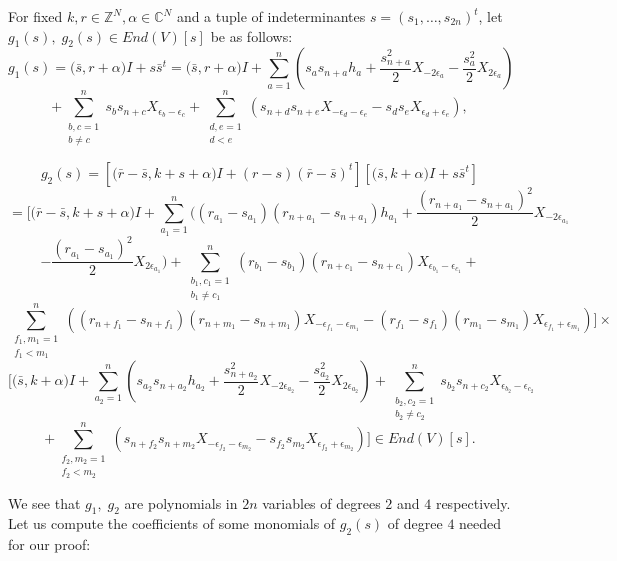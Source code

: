 \documentclass[a4paper,11pt]{amsart}
\numberwithin{equation}{section}
\theoremstyle{plain}
\newcommand{\Z}{\mathbb{Z}}
\newcommand{\C}{\mathbb{C}}
\begin{document}
 For fixed $k,r\in \Z^N, \alpha\in \C^N$ and a tuple of indeterminantes $s=(s_1, \ldots, s_{2n})^t$, let $g_1(s),\; g_2(s)\in End(V)[s]$ be as follows:
 \[g_1(s)= \bm{(}\bar{s},r+\alpha\bm{)}I+s\bar{s}^t=\bm{(}\bar{s},r+\alpha\bm{)}I+\sum_{a=1}^n(s_as_{n+a}h_a+\frac{s_{n+a}^2}{2}X_{-2\epsilon_a}-\frac{s_{a}^2}{2}X_{2\epsilon_a})\]
 \[+\sum_{\substack{b,c=1\\b\neq c}}^ns_bs_{n+c}X_{\epsilon_b-\epsilon_c}+\sum_{\substack{d,e=1\\ d<e}}^n(s_{n+d}s_{n+e}X_{-\epsilon_d-\epsilon_e}-s_ds_eX_{\epsilon_d+\epsilon_e}),\]
 
\[g_2(s)=[\bm{(}\bar{r}-\bar{s},k+s+\alpha\bm{)}I+(r-s)(\bar{r}-\bar{s})^t][\bm{(}\bar{s},k+\alpha\bm{)}I+s\bar{s}^t]\]
\[=[\bm{(}\bar{r}-\bar{s},k+s+\alpha\bm{)}I+\sum_{a_1=1}^n((r_{a_1}-s_{a_1})(r_{n+a_1}-s_{n+a_1})h_{a_1}+\frac{(r_{n+a_1}-s_{n+a_1})^2}{2}X_{-2\epsilon_{a_1}}\]
\[-\frac{(r_{a_1}-s_{a_1})^2}{2}X_{2\epsilon_{a_1}})
+\sum_{\substack{b_1,c_1=1\\ b_1\neq c_1}}^n(r_{b_1}-s_{b_1})(r_{n+c_1}-s_{n+c_1})X_{\epsilon_{b_1}-\epsilon_{c_1}}+ \]
\[
 \sum_{\substack{f_1,m_1=1\\ f_1<m_1}}^n((r_{n+f_1}-s_{n+f_1})(r_{n+m_1}-s_{n+m_1})X_{-\epsilon_{f_1}-\epsilon_{m_1}}-(r_{f_1}-s_{f_1})(r_{m_1}-s_{m_1})X_{\epsilon_{f_1}+\epsilon_{m_1}})]\times\]
 \[[\bm{(}\bar{s},k+\alpha\bm{)}I+\sum_{a_2=1}^n(s_{a_2}s_{n+a_2}h_{a_2}+\frac{s_{n+a_2}^2}{2}X_{-2\epsilon_{a_2}}-\frac{s_{a_2}^2}{2}X_{2\epsilon_{a_2}})
 +\sum_{\substack{b_2,c_2=1\\
 b_2\neq c_2}}^ns_{b_2}s_{n+c_2}X_{\epsilon_{b_2}-\epsilon_{c_2}}\]
 \[+\sum_{\substack{f_2,m_2=1\\ f_2<m_2}}^n(s_{n+f_2}s_{n+m_2}X_{-\epsilon_{f_2}-\epsilon_{m_2}}-s_{f_2}s_{m_2}X_{\epsilon_{f_2}+\epsilon_{m_2}})]\in End(V)[s].\]
 
  
    We see that $g_1, \; g_2$ are polynomials in $2n$ variables of degrees $2$ and $4$ respectively. Let us compute the coefficients of some  monomials of $g_2(s)$ of degree $4$  needed  for our proof:
\end{document}
